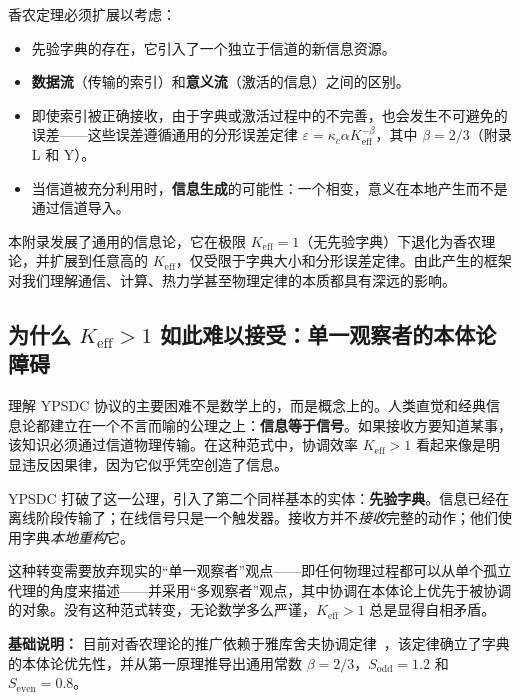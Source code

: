 \documentclass[12pt,a4paper]{article}
\theoremstyle{remark}
\newcommand{\Keff}{K_{\mathrm{eff}}}
\begin{document}
	香农定理必须扩展以考虑：
	\begin{itemize}
		\item 先验字典的存在，它引入了一个独立于信道的新信息资源。
		\item \textbf{数据流}（传输的索引）和\textbf{意义流}（激活的信息）之间的区别。
		\item 即使索引被正确接收，由于字典或激活过程中的不完善，也会发生不可避免的误差——这些误差遵循通用的分形误差定律 $\varepsilon = \kappa_c\alpha K_{\mathrm{eff}}^{-\beta}$，其中 $\beta=2/3$（附录 L 和 Y）。
		\item 当信道被充分利用时，\textbf{信息生成}的可能性：一个相变，意义在本地产生而不是通过信道导入。
	\end{itemize}
	
	本附录发展了通用的信息论，它在极限 $\Keff = 1$（无先验字典）下退化为香农理论，并扩展到任意高的 $\Keff$，仅受限于字典大小和分形误差定律。由此产生的框架对我们理解通信、计算、热力学甚至物理定律的本质都具有深远的影响。
	
	\subsection{为什么 \(K_{\mathrm{eff}} > 1\) 如此难以接受：单一观察者的本体论障碍}
	
	理解 YPSDC 协议的主要困难不是数学上的，而是概念上的。人类直觉和经典信息论都建立在一个不言而喻的公理之上：\textbf{信息等于信号}。如果接收方要知道某事，该知识必须通过信道物理传输。在这种范式中，协调效率 \(K_{\mathrm{eff}} > 1\) 看起来像是明显违反因果律，因为它似乎凭空创造了信息。
	
	YPSDC 打破了这一公理，引入了第二个同样基本的实体：\textbf{先验字典}。信息已经在离线阶段传输了；在线信号只是一个触发器。接收方并不\textit{接收}完整的动作；他们使用字典\textit{本地重构}它。
	
	这种转变需要放弃现实的“单一观察者”观点——即任何物理过程都可以从单个孤立代理的角度来描述——并采用“多观察者”观点，其中协调在本体论上优先于被协调的对象。没有这种范式转变，无论数学多么严谨，\(K_{\mathrm{eff}} > 1\) 总是显得自相矛盾。
	
	\medskip
	
	\textbf{基础说明：} 目前对香农理论的推广依赖于雅库舍夫协调定律~\cite{YakushevLaw2026}，该定律确立了字典的本体论优先性，并从第一原理推导出通用常数 \(\beta = 2/3\)，\(S_{\mathrm{odd}} = 1.2\) 和 \(S_{\mathrm{even}} = 0.8\)。
	
\end{document}
